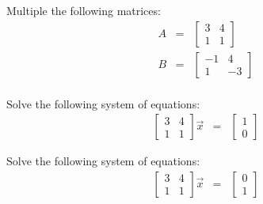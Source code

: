 

\begin{problem} 
\item Multiple the following matrices:
  \begin{eqnarray*}
    A & = & 
    \left[
      \begin{array}{rr}
        3 & 4 \\ 
        1 & 1
      \end{array}
    \right] \\
    B & = & 
    \left[
      \begin{array}{rr}
        -1 & 4 \\
         1 & -3
      \end{array}
    \right] \\
  \end{eqnarray*}

  \vspace{4em}

  \item Solve the following system of equations:
  \begin{eqnarray*}
    \left[
      \begin{array}{rr}
        3 & 4 \\ 
        1 & 1
      \end{array}
    \right] 
    \vec{x} & = & 
    \left[
      \begin{array}{r}
        1 \\
        0
      \end{array}
    \right]
  \end{eqnarray*}

  \vfill

  \item Solve the following system of equations:
  \begin{eqnarray*}
    \left[
      \begin{array}{rr}
        3 & 4 \\ 
        1 & 1
      \end{array}
    \right] 
    \vec{x} & = & 
    \left[
      \begin{array}{r}
        0 \\
        1
      \end{array}
    \right]
  \end{eqnarray*}

  \vfill

\end{problem}


